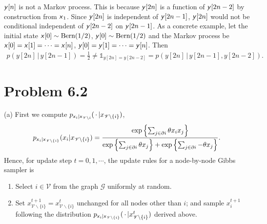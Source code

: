 \documentclass{article}
\newcommand{\s}[1]{\textsf{\textit{#1}}}
\newcommand{\qeds}{\hfill\qedsymbol}
\begin{document}
$\s{y}[n]$ is not a Markov process. This is because $\s{y}[2n]$ is a function of
$\s{y}[2n-2]$ by construction from $\s{x}_1$. Since $\s{y}[2n]$ is independent of
$\s{y}[2n-1]$, $\s{y}[2n]$ would not be conditional independent of $\s{y}[2n-2]$ on
$\s{y}[2n-1]$. As a concrete example, let the initial state
$\s{x}[0] \sim \text{Bern}(1/2)$,
$\s{y}[0] \sim \text{Bern}(1/2)$ and the Markov process be
$\s{x}[0] = \s{x}[1] = \cdots = \s{x}[n]$, 
$\s{y}[0] = \s{y}[1] = \cdots = \s{y}[n]$. Then
\begin{align*}
	p(y[2n] \,\big|\, y[2n - 1]) = \frac{1}{2}
	\neq \mathds{1}_{y[2n] = y[2n - 2]} = p(y[2n] \,\big|\, y[2n - 1], y[2n - 2]).
\end{align*} \qeds
\pagebreak

\section*{Problem 6.2}
(a) First we compute
$p_{\s{x}_i | \s{x}_{\mathscr{V}\backslash i}}(\,\cdot \,| x_{\mathscr{V}\backslash \{i\}})$,
%
\begin{align}
	p_{\s{x}_i | \s{x}_{\mathscr{V}\backslash\{i\}}}(x_i| x_{\mathscr{V}\backslash \{i\}}) =
	\frac{\exp\left\{\sum_{j \in \partial i}\theta x_i x_j\right\}}
	{\exp\left\{\sum_{j \in \partial i}\theta x_j\right\} +
	\exp\left\{\sum_{j \in \partial i} -\theta x_j\right\}}. \label{eq:gibbs_node_sampler_prob}
\end{align}
Hence, for update step $t = 0, 1, \cdots$, the update rules for a node-by-node Gibbs sampler is
\begin{enumerate}
	\item Select $i \in \mathscr{V}$ from the graph $\mathscr{G}$ uniformly at random.
	\item Set $x^{t+1}_{\mathscr{V}\backslash\{i\}} = x^t_{\mathscr{V}\backslash\{i\}}$
	unchanged for all nodes other than $i$; and sample $x^{t+1}_i$ following the
	distribution $p_{\s{x}_i | \s{x}_{\mathscr{V}\backslash \{i\}}}
	(\,\cdot \,| x^t_{\mathscr{V}\backslash \{i\}})$ derived above.\\
\end{enumerate}
\end{document}
